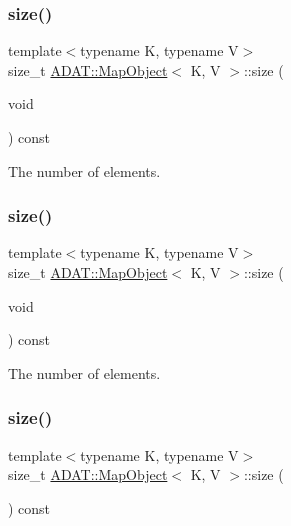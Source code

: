 \subsubsection{\texorpdfstring{size()}{size()}\hspace{0.1cm}{\footnotesize\ttfamily [1/3]}}
{\footnotesize\ttfamily template$<$typename K, typename V$>$ \\
size\+\_\+t \mbox{\hyperlink{classADAT_1_1MapObject}{A\+D\+A\+T\+::\+Map\+Object}}$<$ K, V $>$\+::size (\begin{DoxyParamCaption}\item[{void}]{ }\end{DoxyParamCaption}) const\hspace{0.3cm}{\ttfamily [inline]}}



The number of elements. 

\mbox{\label{classADAT_1_1MapObject_ac0f5c3b258d234a7baf4f3d75e304af7}} 
\subsubsection{\texorpdfstring{size()}{size()}\hspace{0.1cm}{\footnotesize\ttfamily [2/3]}}
{\footnotesize\ttfamily template$<$typename K, typename V$>$ \\
size\+\_\+t \mbox{\hyperlink{classADAT_1_1MapObject}{A\+D\+A\+T\+::\+Map\+Object}}$<$ K, V $>$\+::size (\begin{DoxyParamCaption}\item[{void}]{ }\end{DoxyParamCaption}) const\hspace{0.3cm}{\ttfamily [inline]}}



The number of elements. 

\mbox{\label{classADAT_1_1MapObject_ac0f5c3b258d234a7baf4f3d75e304af7}} 
\subsubsection{\texorpdfstring{size()}{size()}\hspace{0.1cm}{\footnotesize\ttfamily [3/3]}}
{\footnotesize\ttfamily template$<$typename K, typename V$>$ \\
size\+\_\+t \mbox{\hyperlink{classADAT_1_1MapObject}{A\+D\+A\+T\+::\+Map\+Object}}$<$ K, V $>$\+::size (\begin{DoxyParamCaption}{ }\end{DoxyParamCaption}) const\hspace{0.3cm}{\ttfamily [inline]}}




